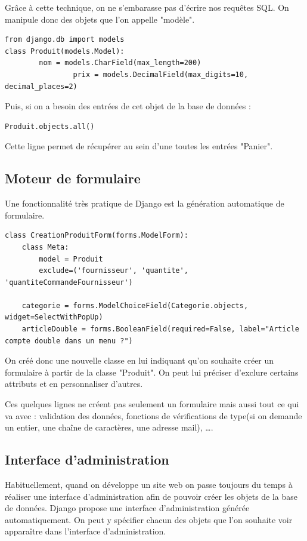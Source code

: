\documentclass[twoside,UTF8]{EPURapport}
\begin{document}
Grâce à cette technique, on ne s'embarasse pas d'écrire nos requêtes SQL. On manipule donc des objets que l'on appelle "modèle".

\lstset{language=Python}
\begin{lstlisting}
from django.db import models
class Produit(models.Model):
        nom = models.CharField(max_length=200)
                prix = models.DecimalField(max_digits=10, decimal_places=2)
\end{lstlisting}

Puis, si on a besoin des entrées de cet objet de la base de données :

\begin{lstlisting}
Produit.objects.all()
\end{lstlisting}

Cette ligne permet de récupérer au sein d'une toutes les entrées "Panier".

    \subsection{Moteur de formulaire}
Une fonctionnalité très pratique de Django est la génération automatique de formulaire.

\begin{lstlisting}
class CreationProduitForm(forms.ModelForm):
    class Meta:
        model = Produit
        exclude=('fournisseur', 'quantite', 'quantiteCommandeFournisseur')

    categorie = forms.ModelChoiceField(Categorie.objects, widget=SelectWithPopUp)
    articleDouble = forms.BooleanField(required=False, label="Article compte double dans un menu ?")
\end{lstlisting}

On créé donc une nouvelle classe en lui indiquant qu'on souhaite créer un formulaire à partir de la classe "Produit". On peut lui préciser d'exclure certains attributs et en personnaliser d'autres.

Ces quelques lignes ne créent pas seulement un formulaire mais aussi tout ce qui va avec : validation des données, fonctions de vérifications de type(si on demande un entier, une chaîne de caractères, une adresse mail), \ldots.

    \subsection{Interface d'administration}
Habituellement, quand on développe un site web on passe toujours du temps à réaliser une interface d'administration afin de pouvoir créer les objets de la base de données. Django propose une interface d'administration générée automatiquement. On peut y spécifier chacun des objets que l'on souhaite voir apparaître dans l'interface d'administration.
\end{document}
